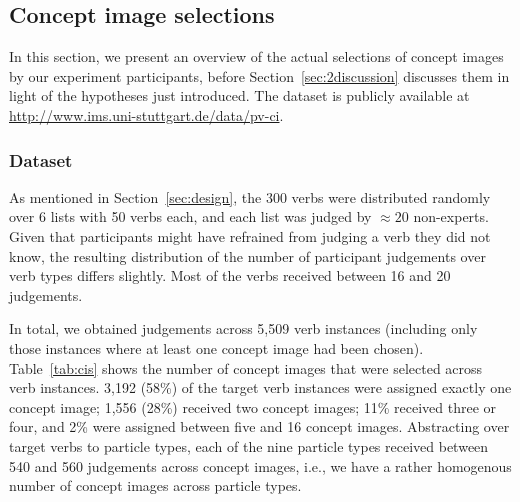 \documentclass[output=paper]{langsci/langscibook}
\begin{document}
\subsection{Concept image selections}

In this section, we present an overview of the actual selections of
concept images by our experiment participants, before
Section~\ref{sec:2discussion} discusses them in light of the hypotheses
just introduced. The dataset is publicly available at
\url{http://www.ims.uni-stuttgart.de/data/pv-ci}.

\subsubsection{Dataset}

As mentioned in Section~\ref{sec:design}, the 300 verbs were
distributed randomly over 6 lists with 50 verbs each, and each list
was judged by ${\approx}20$ non-experts. Given that participants might
have refrained from judging a verb they did not know, the resulting
distribution of the number of participant judgements over verb types
differs slightly.
Most of the verbs received between 16 and 20 judgements.

In total, we obtained judgements across 5,509 verb instances
(including only those instances where at least one concept image had
been chosen).
Table~\ref{tab:cis} shows the number of concept images that were selected across
verb instances.  3,192 (58\%) of the target verb instances were
assigned exactly one concept image; 1,556 (28\%) received two concept
images; 11\% received three or four, and 2\% were assigned between
five and 16 concept images. Abstracting over target verbs to particle
types, each of the nine particle types received between 540 and 560
judgements across concept images, i.e., we have a rather homogenous number of concept images
across particle types.


\begin{table}
  \caption{Number of selected concept images per verb instance.\label{tab:cis}}
\end{table}
\end{document}
